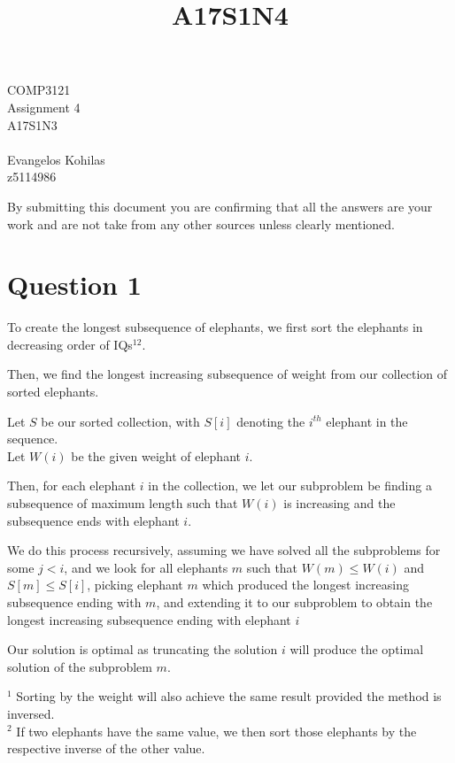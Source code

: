 \documentclass{article}
\title{A17S1N4}
\begin{document}
\begin{center}
    \begin{LARGE}
        COMP3121\\
        Assignment 4\\
        A17S1N3\\
        \hrulefill\\
        Evangelos Kohilas\\
        z5114986\\
        \hrulefill
    \end{LARGE}

    \begin{large}
        By submitting this document you are confirming that all the answers are your work and are not take from any other sources unless clearly mentioned.
    \end{large}

\end{center}

\section*{Question 1}
To create the longest subsequence of elephants, we first sort the elephants in decreasing order of IQs$^{12}$.

Then, we find the longest increasing subsequence of weight from our collection of sorted elephants.

Let $S$ be our sorted collection, with $S[i]$ denoting the $i^{th}$ elephant in the sequence.\\
Let $W(i)$ be the given weight of elephant $i$.

Then, for each elephant $i$ in the collection, we let our subproblem be finding a subsequence of maximum length such that $W(i)$ is increasing and the subsequence ends with elephant $i$.

We do this process recursively, assuming we have solved all the subproblems for some $j < i$, and we look for all elephants $m$ such that $W(m) \leq W(i)$ and $S[m] \leq  S[i]$, picking elephant $m$ which produced the longest increasing subsequence ending with $m$, and extending it to our subproblem to obtain the longest increasing subsequence ending with elephant $i$

Our solution is optimal as truncating the solution $i$ will produce the optimal solution of the subproblem $m$.

$^1$ Sorting by the weight will also achieve the same result provided the method is inversed.\\
$^2$ If two elephants have the same value, we then sort those elephants by the respective inverse of the other value.
\end{document}
